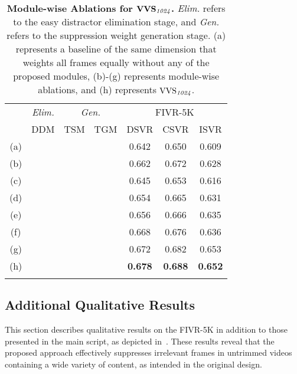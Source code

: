 \documentclass[10pt,twocolumn,letterpaper]{article}
\newcommand{\cmark}{\ding{51}}
\begin{document}
    \begin{table}[!t] \footnotesize
        \centering
        \begin{tabular}{c|ccc|ccc}
            \cmidrule[\heavyrulewidth]{1-7}
            \morecmidrules
            \cmidrule[\heavyrulewidth]{1-7}
\multicolumn{1}{c}{\multirow{2}{*}[-.3em]{$\textbf{\textup{VVS}}_{\textit{1024}}$}}
            & \multicolumn{1}{|c|}{\textit{Elim.}}  & \multicolumn{2}{c|}{\textit{Gen.}} & \multicolumn{3}{c}{FIVR-5K} \\ \cmidrule(){2-7} 
           
                &\multicolumn{1}{c|}{DDM} & TSM    & TGM    & DSVR  & CSVR  & ISVR  \\ \midrule 
            (a) &       &        &        & 0.642 &	0.650 &	0.609 \\ \midrule
            (b) &\cmark &        &        & 0.662 &	0.672 &	0.628 \\ \midrule
            (c) &       & \cmark &        & 0.645 &	0.653 &	0.616 \\
            (d) &       &        & \cmark & 0.654 &	0.665 &	0.631 \\
            (e) &       & \cmark & \cmark & 0.656 &	0.666 &	0.635 \\ \midrule 
            (f) &\cmark & \cmark &        & 0.668 &	0.676 &	0.636 \\ 
            (g) &\cmark &        & \cmark & 0.672 &	0.682 &	0.653 \\ \midrule
            (h) &\cmark & \cmark & \cmark & \textbf{0.678} & \textbf{0.688} & \textbf{0.652} \\
            \cmidrule[\heavyrulewidth]{1-7}
            \morecmidrules
            \cmidrule[\heavyrulewidth]{1-7}
        \end{tabular}
        \vspace{-0mm}
        \caption{\textbf{Module-wise Ablations for $\textbf{\textup{VVS}}_{\textit{1024}}$\textbf{.} }\textit{Elim.} refers to the easy distractor elimination stage, and \textit{Gen.} refers to the suppression weight generation stage. (a) represents a baseline of the same dimension that weights all frames equally without any of the proposed modules, (b)-(g) represents module-wise ablations, and (h) represents $\textup{VVS}_{\textit{1024}}$. \vspace{3mm}}
        \label{tab:module_ablation1024}
    \end{table}
    
    \subsection{Additional Qualitative Results}\label{qual_exp}
        This section describes qualitative results on the FIVR-5K in addition to those presented in the main script, as depicted in~. These results reveal that the proposed approach effectively suppresses irrelevant frames in untrimmed videos containing a wide variety of content, as intended in the original design.
\end{document}
